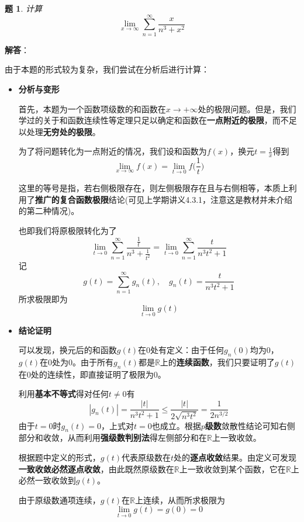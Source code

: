 \documentclass[a4paper,UTF8,fontset=windows,AutoFakeBold]{ctexart}
\newcommand*{\rb}{\mathbb{R}}
\newcommand*{\suminf}[1][n=1]{\sum_{#1}^\infty}
\newcommand*{\note}{\noindent *}
\theoremstyle{ex}
\newtheorem{exercise}{题}
\newcommand{\sol}[1]{{\vspace{5pt}\kaishu\noindent\textbf{解答}：\vspace{-3pt}
\begin{compactitem}
    \item[] #1
\end{compactitem}
}}
\begin{document}
\begin{framed}
\begin{exercise}
    计算
    $$\lim_{x\to\infty}\suminf\frac{x}{n^3+x^2}$$
\end{exercise}
\sol{
    由于本题的形式较为复杂，我们尝试在分析后进行计算：
    \begin{itemize}
        \item \textbf{分析与变形}
        
        首先，本题为一个函数项级数的和函数在$x\to+\infty$处的极限问题。但是，我们学过的关于和函数连续性等定理只足以确定和函数在\textbf{一点附近的极限}，而不足以处理\textbf{无穷处的极限}。

        为了将问题转化为一点附近的情况，我们设和函数为$f(x)$，换元$t=\frac{1}{x}$得到
        $$\lim_{x\to\infty}f(x)=\lim_{t\to0}f\bigg(\frac{1}{t}\bigg)$$
        
        \note 这里的等号是指，若右侧极限存在，则左侧极限存在且与右侧相等，本质上利用了\textbf{推广的复合函数极限}结论(可见上学期讲义4.3.1，注意这是教材并未介绍的第二种情况)。

        也即我们将原极限转化为了
        $$\lim_{t\to0}\suminf\frac{\frac{1}{t}}{n^3+\frac{1}{t^2}}=\lim_{t\to0}\suminf\frac{t}{n^3t^2+1}$$
        记
        $$g(t)=\suminf g_n(t),\quad g_n(t)=\frac{t}{n^3t^2+1}$$
        所求极限即为
        $$\lim_{t\to0}g(t)$$

        \item \textbf{结论证明}
        
        可以发现，换元后的和函数$g(t)$在0处有定义：由于任何$g_n(0)$均为0，$g(t)$在0处为0。由于所有$g_n(t)$都是$\rb$上的\textbf{连续函数}，我们只要证明了$g(t)$在0处的连续性，即直接证明了极限为0。

        利用\textbf{基本不等式}得对任何$t\ne0$有
        $$|g_n(t)|=\frac{|t|}{n^3t^2+1}\le\frac{|t|}{2\sqrt{n^3t^2}}=\frac{1}{2n^{3/2}}$$
        由于$t=0$时$g_n(t)=0$，上式对$t=0$也成立。根据\textbf{$p$级数}敛散性结论可知右侧部分和收敛，从而利用\textbf{强级数判别法}得左侧部分和在$\rb$上一致收敛。

        根据题中定义的形式，$g(t)$代表原级数在$t$处的\textbf{逐点收敛}结果。由定义可发现\textbf{一致收敛必然逐点收敛}，由此既然原级数在$\rb$上一致收敛到某个函数，它在$\rb$上必然一致收敛到$g(t)$。

        由于原级数通项连续，$g(t)$在$\rb$上连续，从而所求极限为
        $$\lim_{t\to0}g(t)=g(0)=0$$
    \end{itemize}
}
\end{framed}
\end{document}
